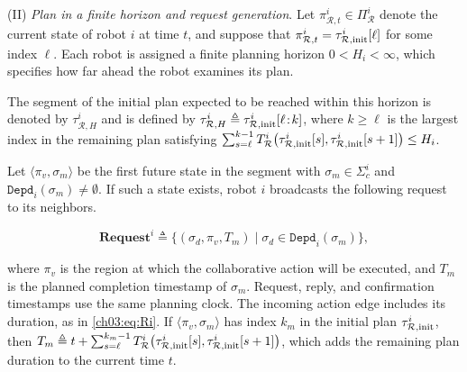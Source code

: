 (II) \emph{Plan in a finite horizon and request generation}.
Let $\pi_{\mathcal{R},t}^i \in \Pi_{\mathcal{R}}^i$ denote the current state of
robot $i$ at time $t$, and suppose that
$\pi_{\mathcal{R},t}^i=\tau_{\mathcal{R},\textup{init}}^i[\ell]$ for some
index $\ell$. Each robot is assigned a finite planning horizon
$0 < H_i < \infty$, which specifies how far ahead the robot examines its plan.
\begin{revision}
The segment of the initial plan expected to be reached within this horizon is
denoted by $\tau_{\mathcal{R},H}^i$ and is defined by
$\tau_{\mathcal{R},H}^i \triangleq
\tau_{\mathcal{R},\textup{init}}^i[\ell\!:\!k]$,
where $k \ge \ell$ is the largest index in the remaining plan satisfying
$
\sum_{s=\ell}^{k-1}
T_{\mathcal{R}}^i\!\left(
\tau_{\mathcal{R},\textup{init}}^i[s],
\tau_{\mathcal{R},\textup{init}}^i[s+1]
\right)
\le H_i$.

Let $\langle \pi_v,\sigma_m \rangle$ be the first future state in the segment
with $\sigma_m \in \Sigma_c^i$ and $\texttt{Depd}_i(\sigma_m)\ne\emptyset$.
If such a state exists, robot $i$ broadcasts the following request to its neighbors.
\end{revision}
\begin{equation}
\label{ch03:request}
\textbf{Request}^i \triangleq
\{(\sigma_d,\pi_v,T_m) \mid
  \sigma_d \in \texttt{Depd}_i(\sigma_m)\},
\end{equation}
\begin{revision}
where $\pi_v$ is the region at which the collaborative action will be executed,
and $T_m$ is the planned completion timestamp of $\sigma_m$.
Request, reply, and confirmation timestamps use the same planning clock.
The incoming action edge includes its duration, as in \eqref{ch03:eq:Ri}. If $\langle \pi_v,\sigma_m \rangle$ has index $k_m$ in the
initial plan $\tau_{\mathcal{R},\textup{init}}^i$, then
$T_m \triangleq t+
\sum_{s=\ell}^{k_m-1}
T_{\mathcal{R}}^i\!\left(
\tau_{\mathcal{R},\textup{init}}^i[s],
\tau_{\mathcal{R},\textup{init}}^i[s+1]
\right)$,
which adds the remaining plan duration to the current time $t$.
\end{revision}
 

